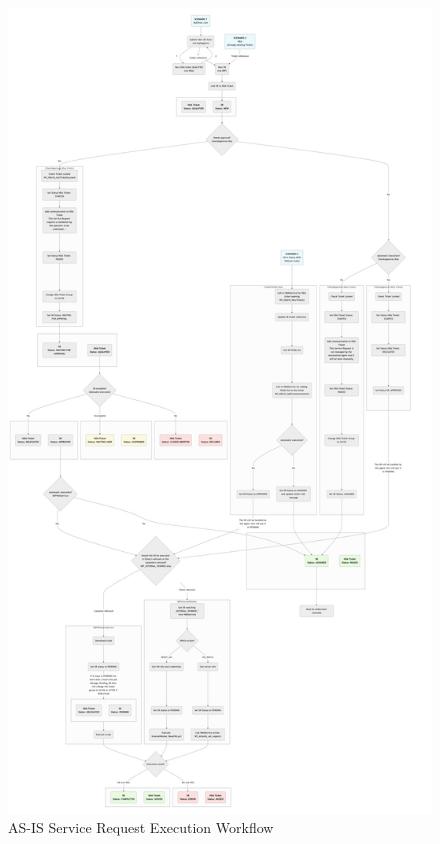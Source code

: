 \begin{figure}[htbp]
    \centering
    \includegraphics[width=\textwidth, height=\textheight, keepaspectratio]{images/as-is/Flowchart AS-IS.jpg}
    \caption{AS-IS Service Request Execution Workflow}
    \label{fig:flowchart-as-is}
\end{figure}

